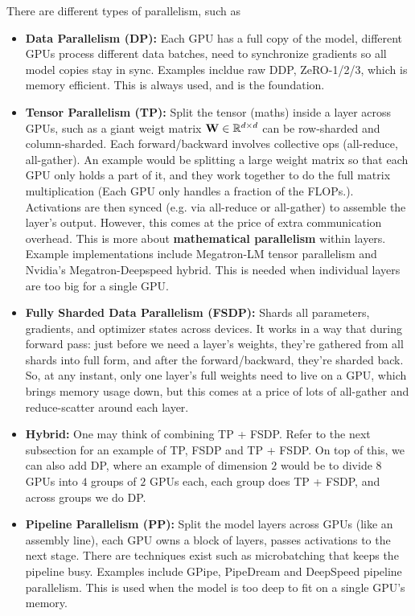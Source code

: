 \documentclass[11pt]{article}  %
\begin{document}
There are different types of parallelism, such as 
\begin{itemize}
  \item \textbf{Data Parallelism (DP):} Each GPU has a full copy of the model, different GPUs process different data batches, need to synchronize gradients so all model copies stay in sync.
  Examples incldue raw DDP, ZeRO-1/2/3, which is memory efficient.
  This is always used, and is the foundation.

  \item \textbf{Tensor Parallelism (TP):} Split the tensor (maths) inside a layer across GPUs, such as a giant weigt matrix $\mathbf{W} \in \mathbb{R}^{d \times d}$ can be row-sharded and column-sharded. Each forward/backward involves collective ops (all-reduce, all-gather).
  An example would be splitting a large weight matrix so that each GPU only holds a part of it, and they work together to do the full matrix multiplication (Each GPU only handles a fraction of the FLOPs.).
  Activations are then synced (e.g. via all-reduce or all-gather) to assemble the layer's output.
  However, this comes at the price of extra communication overhead.
  This is more about \textbf{mathematical parallelism} within layers.
  Example implementations include Megatron-LM tensor parallelism and Nvidia's Megatron-Deepspeed hybrid.
  This is needed when individual layers are too big for a single GPU.

  \item \textbf{Fully Sharded Data Parallelism (FSDP):} Shards all parameters, gradients, and optimizer states across devices.
  It works in a way that during forward pass: just before we need a layer's weights, they're gathered from all shards into full form, and after the forward/backward, they're sharded back.
  So, at any instant, only one layer's full weights need to live on a GPU, which brings memory usage down, but this comes at a price of lots of all-gather and reduce-scatter around each layer.

  \item \textbf{Hybrid:} One may think of combining TP + FSDP. 
  Refer to the next subsection for an example of TP, FSDP and TP + FSDP.
  On top of this, we can also add DP, where an example of dimension $2$ would be to divide $8$ GPUs into $4$ groups of $2$ GPUs each, each group does TP + FSDP, and across groups we do DP.

  \item \textbf{Pipeline Parallelism (PP):} Split the model layers across GPUs (like an assembly line), each GPU owns a block of layers, passes activations to the next stage.
  There are techniques exist such as microbatching that keeps the pipeline busy.
  Examples include GPipe, PipeDream and DeepSpeed pipeline parallelism.
  This is used when the model is too deep to fit on a single GPU's memory.


\end{itemize}
\end{document}
